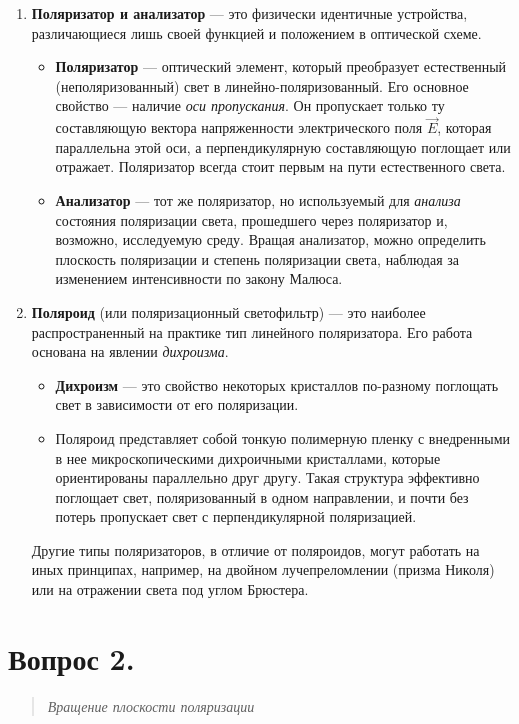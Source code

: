 \begin{enumerate}
    \item \textbf{Поляризатор и анализатор} — это физически идентичные устройства, различающиеся лишь своей функцией и положением в оптической схеме.
        \begin{itemize}
            \item \textbf{Поляризатор} — оптический элемент, который преобразует естественный (неполяризованный) свет в линейно-поляризованный. Его основное свойство — наличие \textit{оси пропускания}. Он пропускает только ту составляющую вектора напряженности электрического поля $\vec{E}$, которая параллельна этой оси, а перпендикулярную составляющую поглощает или отражает. Поляризатор всегда стоит первым на пути естественного света.
            
            \item \textbf{Анализатор} — тот же поляризатор, но используемый для \textit{анализа} состояния поляризации света, прошедшего через поляризатор и, возможно, исследуемую среду. Вращая анализатор, можно определить плоскость поляризации и степень поляризации света, наблюдая за изменением интенсивности по закону Малюса.
        \end{itemize}
    
    \item \textbf{Поляроид} (или поляризационный светофильтр) — это наиболее распространенный на практике тип линейного поляризатора. Его работа основана на явлении \textit{дихроизма}.
        \begin{itemize}
            \item \textbf{Дихроизм} — это свойство некоторых кристаллов по-разному поглощать свет в зависимости от его поляризации.
            \item Поляроид представляет собой тонкую полимерную пленку с внедренными в нее микроскопическими дихроичными кристаллами, которые ориентированы параллельно друг другу. Такая структура эффективно поглощает свет, поляризованный в одном направлении, и почти без потерь пропускает свет с перпендикулярной поляризацией.
        \end{itemize}
        Другие типы поляризаторов, в отличие от поляроидов, могут работать на иных принципах, например, на двойном лучепреломлении (призма Николя) или на отражении света под углом Брюстера.
\end{enumerate}

\section*{Вопрос 2.}
\begin{quote}
    \textit{Вращение плоскости поляризации}
\end{quote}

